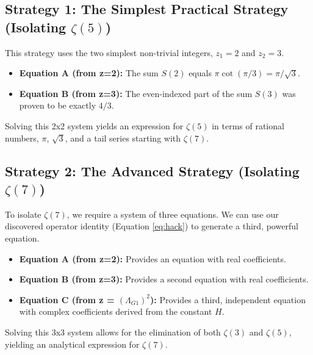 \documentclass[11pt]{article}
\begin{document}
\subsection{Strategy 1: The Simplest Practical Strategy (Isolating $\zeta(5)$)}
This strategy uses the two simplest non-trivial integers, $z_1=2$ and $z_2=3$.
\begin{itemize}
    \item \textbf{Equation A (from z=2):} The sum $S(2)$ equals $\pi \cot(\pi/3) = \pi/\sqrt{3}$.
    \item \textbf{Equation B (from z=3):} The even-indexed part of the sum $S(3)$ was proven to be exactly $4/3$.
\end{itemize}
Solving this 2x2 system yields an expression for $\zeta(5)$ in terms of rational numbers, $\pi$, $\sqrt{3}$, and a tail series starting with $\zeta(7)$.

\subsection{Strategy 2: The Advanced Strategy (Isolating $\zeta(7)$)}
To isolate $\zeta(7)$, we require a system of three equations. We can use our discovered operator identity (Equation \ref{eq:hack}) to generate a third, powerful equation.
\begin{itemize}
    \item \textbf{Equation A (from z=2):} Provides an equation with real coefficients.
    \item \textbf{Equation B (from z=3):} Provides a second equation with real coefficients.
    \item \textbf{Equation C (from z = $(\Lambda_{G1})^2$):} Provides a third, independent equation with complex coefficients derived from the constant $H$.
\end{itemize}
Solving this 3x3 system allows for the elimination of both $\zeta(3)$ and $\zeta(5)$, yielding an analytical expression for $\zeta(7)$.
\end{document}
